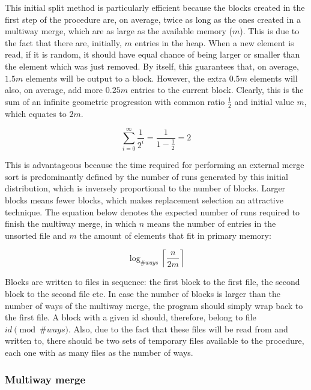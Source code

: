 \documentclass[10pt,a4paper]{article}
\begin{document}
This initial split method is particularly efficient because the blocks created in the first step of the procedure are, on average, twice as long as the ones created in a multiway merge, which are as large as the available memory ($m$). This is due to the fact that there are, initially, $m$ entries in the heap. When a new element is read, if it is random, it should have equal chance of being larger or smaller than the element which was just removed. By itself, this guarantees that, on average, $1.5m$ elements will be output to a block. However, the extra $0.5m$ elements will also, on average, add more $0.25m$ entries to the current block. Clearly, this is the sum of an infinite geometric progression with common ratio $\frac{1}{2}$ and initial value $m$, which equates to $2m$.

\[
    \sum_{i=0}^{\infty} \frac{1}{2^i} = \frac{1}{1 - \frac{1}{2}} = 2
\]

This is advantageous because the time required for performing an external merge sort is predominantly defined by the number of runs generated by this initial distribution, which is inversely proportional to the number of blocks. Larger blocks means fewer blocks, which makes replacement selection an attractive technique. The equation below denotes the expected number of runs required to finish the multiway merge, in which $n$ means the number of entries in the unsorted file and $m$ the amount of elements that fit in primary memory:

\[
    \log_{\#ways} \left \lceil{\frac{n}{2m}}\right \rceil
\]

Blocks are written to files in sequence: the first block to the first file, the second block to the second file etc. In case the number of blocks is larger than the number of ways of the multiway merge, the program should simply wrap back to the first file. A block with a given id should, therefore, belong to file $id \pmod {\#ways}$. Also, due to the fact that these files will be read from and written to, there should be two sets of temporary files available to the procedure, each one with as many files as the number of ways.

\subsubsection*{Multiway merge}
\end{document}
